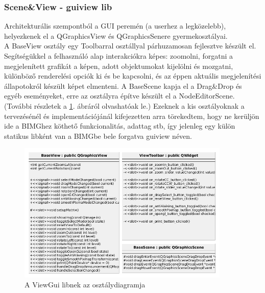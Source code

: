 \documentclass[a4paper,12pt,oneside]{report}
\begin{document}
\subsubsection{Scene\&View - guiview lib}
Architekturális szempontból a GUI peremén (a userhez a legközelebb), helyezkenek el a QGraphicsView és QGraphicsSenere gyermekosztályai.\\
A BaseView osztály egy Toolbarral osztállyal párhuzamosan fejlesztve készült el. Segítségükkel a felhasználó alap interakciókra képes: zoomolni, forgatni a megjelenített grafikát a képen, adott objektumokat kijelölni és mozgatni, különböző renderelési opciók ki és be kapcsolni, és az éppen aktuális megjelenítési állapotokról készült képet elmenteni. A BaseScene kapja el a Drag\&Drop és egyéb eseményeket, erre az osztályra építve készült el a NodeEditorScene. (További részletek a \ref{fig:bimg_viewgui}. ábráról olvashatóak le.)
Ezeknek a kis osztályoknak a tervezésénél és implementációjánál kifejezetten arra törekedtem, hogy ne kerüljön ide a BIMGhez köthető funkcionalitás, adattag stb, így jelenleg egy külön statikus libként van a BIMGbe bele forgatva guiview néven.
\begin{center}
\begin{figure}[h]
  \includegraphics[width=0.9\textwidth]{viewgui_dia.png}
  \caption{A ViewGui libnek az osztálydiagramja }

  \label{fig:bimg_viewgui}
\end{figure}
\end{center}
\end{document}
